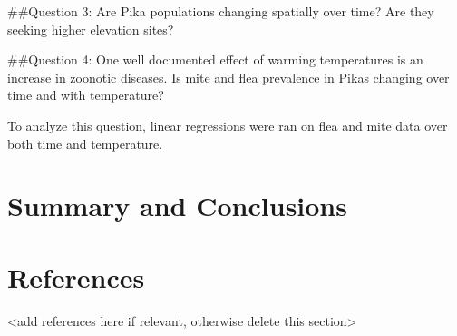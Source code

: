 \documentclass[
  12pt,
]{article}
\begin{document}
\#\#Question 3: Are Pika populations changing spatially over time? Are
they seeking higher elevation sites?

\#\#Question 4: One well documented effect of warming temperatures is an
increase in zoonotic diseases. Is mite and flea prevalence in Pikas
changing over time and with temperature?

To analyze this question, linear regressions were ran on flea and mite
data over both time and temperature.

\newpage

\hypertarget{summary-and-conclusions}{%
\section{Summary and Conclusions}\label{summary-and-conclusions}}

\newpage

\hypertarget{references}{%
\section{References}\label{references}}

\textless add references here if relevant, otherwise delete this
section\textgreater{}
\end{document}
